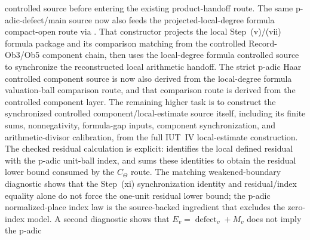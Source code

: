 \begin{proposition}
  controlled source before entering the existing product-handoff route.
  The same p-adic-defect/main source now also feeds the projected-local-degree
  formula compact-open route via
  .
  That constructor projects the local Step~(v)/(vii) formula package and its
  comparison matching from the controlled Record-Ob3/Ob5 component chain, then
  uses the local-degree formula controlled source to synchronize the
  reconstructed local arithmetic handoff.
  The strict p-adic Haar controlled component source is now also derived from
  the local-degree formula valuation-ball comparison route, and that comparison
  route is derived from the controlled component layer.  The remaining higher
  task is to construct the synchronized controlled component/local-estimate
  source itself, including its finite sums, nonnegativity, formula-gap inputs,
  component synchronization, and arithmetic-divisor calibration, from the full
  IUT~IV local-estimate construction.
  The checked residual calculation is explicit:
  identifies the local defined residual with the p-adic unit-ball index, and
  sums these identities to obtain the residual lower bound consumed by the
  \(C_\Theta\) route.
  The matching weakened-boundary diagnostic
  shows that the Step~(xi) synchronization identity and residual/index
  equality alone do not force the one-unit residual lower bound; the p-adic
  normalized-place index law is the source-backed ingredient that excludes the
  zero-index model.
  A second diagnostic
  shows that \(E_v=\operatorname{defect}_v+M_v\) does not imply the p-adic

\end{proposition}
